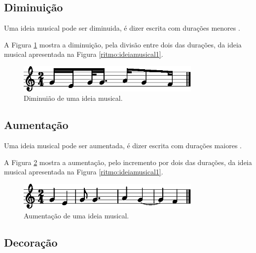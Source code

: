 \subsection{Diminuição}

Uma ideia musical pode ser diminuida, é dizer escrita com durações menores
\cite[pp. 30]{bennett1993elementos}.

A Figura \ref{ritmo:diminuicao-ex1} mostra a diminuição, pela divisão entre dois das durações, 
da ideia musical apresentada na Figura \ref{ritmo:ideiamusical1}.
\begin{figure}[H]
\vspace{-5px}
\centering
    \includegraphics[width=0.8\textwidth]{chapters/cap-musica-composer/diminuicao-ex1-1.eps}
\vspace{-5px}
\caption{Diminuião de uma ideia musical.}
\label{ritmo:diminuicao-ex1}
\end{figure}

\subsection{Aumentação}

Uma ideia musical pode ser aumentada, é dizer escrita com durações maiores
\cite[pp. 30]{bennett1993elementos}.

A Figura \ref{ritmo:aumentacao-ex1} mostra a aumentação, pelo incremento por dois das durações, 
da ideia musical apresentada na Figura \ref{ritmo:ideiamusical1}.
\begin{figure}[H]
\centering
    \includegraphics[width=0.8\textwidth]{chapters/cap-musica-composer/aumentacao-ex1-1.eps}
\caption{Aumentação de uma ideia musical.}
\label{ritmo:aumentacao-ex1}
\end{figure}

\subsection{Decoração}

